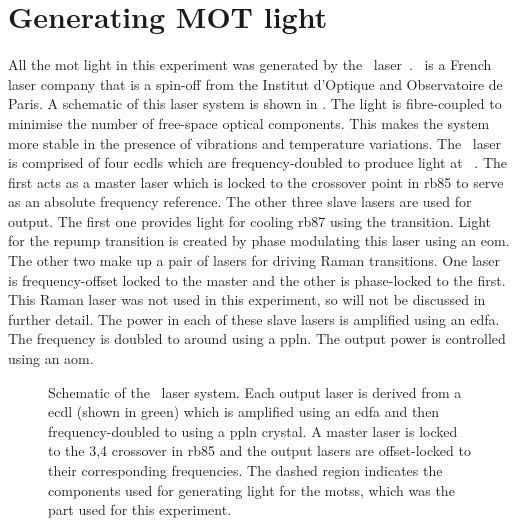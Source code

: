 \section{Generating MOT light}\label{sec:muquans_light}
 All the \ac{mot} light in this experiment was generated by the
 \Muquans\
laser~\cite{muquansWebPage}. \Muquans\ is a French laser company that is a
spin-off from the Institut d'Optique and Observatoire de Paris. A
schematic of
this laser system is shown in . The
light is fibre-coupled to minimise the number of free-space optical components.
This makes the system more stable in the presence of vibrations and
temperature variations. The \Muquans\ laser is comprised of four
\sivalue{1560}{\nano\metre} \acp{ecdl} which are frequency-doubled to produce
light at
~\cite{Menoret2011}\nocite{Leveque2014}. The first acts as a master laser
which is locked to the \trans{3}{3,4} crossover point in
\ac{rb85} to serve as an absolute frequency reference. The other three slave
lasers are used for output. The first one provides light for cooling \ac{rb87} using the  transition.
Light for the \trans{1}{2} repump transition is created by phase modulating this laser using an \ac{eom}.
The other two make up a pair of lasers for driving Raman transitions. One laser
is frequency-offset locked to the master and the other is phase-locked to the
first. This Raman laser was not used in this experiment, so will
not be discussed in further detail. The power in each of these slave lasers is amplified using
an \ac{edfa}. The frequency is doubled to around \sivalue{780}{\nano\metre} using a \ac{ppln}. The output power is controlled using an
\ac{aom}.
\begin{figure}[!htbp]
  \fontsize{8pt}{8pt}
  \resizebox{1\textwidth}{!}{}
	\caption[\Muquans\ Laser System Diagram]{Schematic of the \Muquans\
  laser system. Each output laser is derived from
a\sivalue{1560}{\nano\metre} \acs{ecdl} (shown in green) which is
amplified using an \acs{edfa} and then frequency-doubled to
\sivalue{780}{\nano\metre} using a \acs{ppln} crystal. A master laser
is locked to the 3,4 crossover in \ac{rb85} and the output lasers are
offset-locked to their corresponding frequencies. The dashed region
indicates the components used for generating light for the \acp{mots},
which was the part used for this experiment.}\label{fig:muquans_schematic}
\end{figure}
